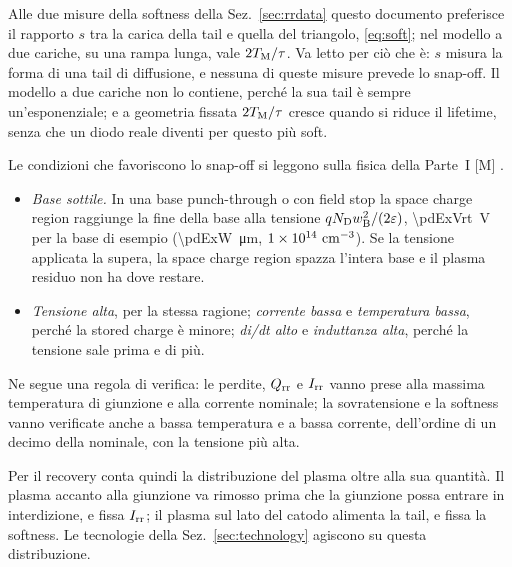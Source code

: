 \documentclass[10pt,a4paper]{scrartcl}
\let\newcommand\pdvaluedefine
\newcommand{\Irr}{I_\mathrm{rr}}
\newcommand{\Qrr}{Q_\mathrm{rr}}
\newcommand{\TM}{T_\mathrm{M}}
\newcommand{\ND}{N_\mathrm{D}}
\newcommand{\wB}{w_\mathrm{B}}
\newcommand{\Pp}{p\textsuperscript{+}}
\newcommand{\Nm}{n\textsuperscript{--}}
\newcommand{\cmc}{\si{\centi\metre^{-3}}}
\begin{document}
Alle due misure della softness della Sez.~\ref{sec:rrdata} questo documento preferisce il rapporto $s$ tra la carica della tail e quella del triangolo, \eqref{eq:soft}; nel modello a due cariche, su una rampa lunga, vale $2\TM/\tau$. Va letto per ciò che è: $s$ misura la forma di una tail di diffusione, e nessuna di queste misure prevede lo snap-off. Il modello a due cariche non lo contiene, perché la sua tail è sempre un'esponenziale; e a geometria fissata $2\TM/\tau$ cresce quando si riduce il lifetime, senza che un diodo reale diventi per questo più soft.

Le condizioni che favoriscono lo snap-off si leggono sulla fisica della Parte~I [M] \cite{lutz}.
\begin{itemize}
\item \emph{Base sottile.} In una base punch-through o con field stop la space charge region raggiunge la fine della base alla tensione $q\ND\wB^2/(2\varepsilon)$, \SI{\pdExVrt}{\volt} per la base di esempio (\SI{\pdExW}{\micro\metre}, $\pdExNd\ \cmc$). Se la tensione applicata la supera, la space charge region spazza l'intera base e il plasma residuo non ha dove restare.
\item \emph{Tensione alta}, per la stessa ragione; \emph{corrente bassa} e \emph{temperatura bassa}, perché la stored charge è minore; \emph{di/dt alto} e \emph{induttanza alta}, perché la tensione sale prima e di più.
\end{itemize}
Ne segue una regola di verifica: le perdite, $\Qrr$ e $\Irr$ vanno prese alla massima temperatura di giunzione e alla corrente nominale; la sovratensione e la softness vanno verificate anche a bassa temperatura e a bassa corrente, dell'ordine di un decimo della nominale, con la tensione più alta.

Per il recovery conta quindi la distribuzione del plasma oltre alla sua quantità. Il plasma accanto alla giunzione \Pp\Nm{} va rimosso prima che la giunzione possa entrare in interdizione, e fissa $\Irr$; il plasma sul lato del catodo alimenta la tail, e fissa la softness. Le tecnologie della Sez.~\ref{sec:technology} agiscono su questa distribuzione.
\end{document}
